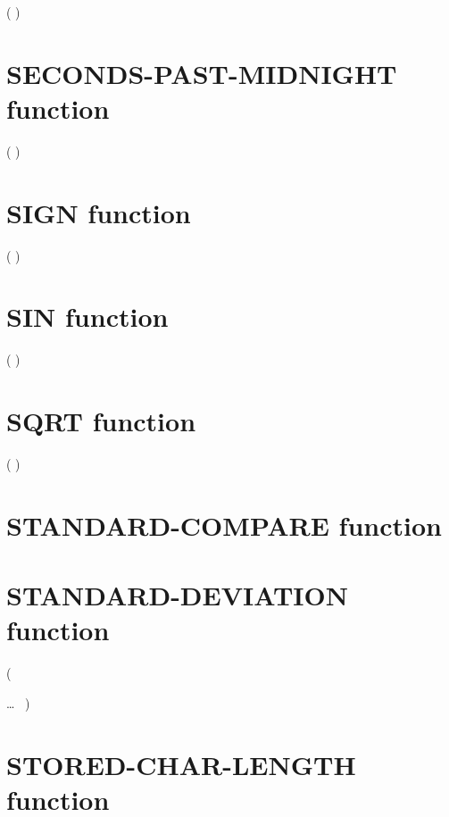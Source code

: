 ( \argument \argument)

\section{SECONDS-PAST-MIDNIGHT function}

  ( \argument )

\section{SIGN function}

  ( \argument )

\section{SIN function}

  ( \argument )

\section{SQRT function}

  ( \argument )

\section{STANDARD-COMPARE function}


\pending{
  ( \argument \argument
  \begin{0-1}
    \argument
  \end{0-1}
  \begin{0-1}
    \argument
  \end{0-1}
  )
}

\section{STANDARD-DEVIATION function}

  (
\begin{1=}
  \argument
\end{1=}\ldots
\ {})

\section{STORED-CHAR-LENGTH function}

